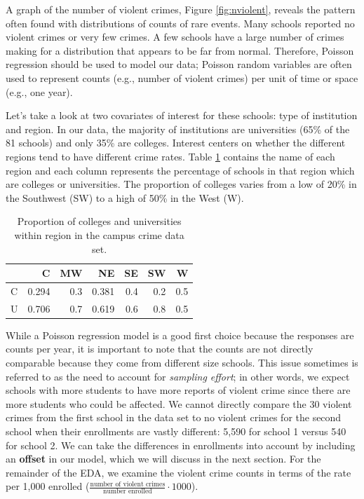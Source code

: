\documentclass[
]{krantz}
\begin{document}
A graph of the number of violent crimes, Figure \ref{fig:nviolent}, reveals the pattern often found with distributions of counts of rare events. Many schools reported no violent crimes or very few crimes. A few schools have a large number of crimes making for a distribution that appears to be far from normal. Therefore, Poisson regression should be used to model our data; Poisson random variables are often used to represent counts (e.g., number of violent crimes) per unit of time or space (e.g., one year).

Let's take a look at two covariates of interest for these schools: type of institution and region. In our data, the majority of institutions are universities (65\% of the 81 schools) and only 35\% are colleges. Interest centers on whether the different regions tend to have different crime rates. Table \ref{tab:regions} contains the name of each region and each column represents the percentage of schools in that region which are colleges or universities. The proportion of colleges varies from a low of 20\% in the Southwest (SW) to a high of 50\% in the West (W).

\begin{table}

\caption{\label{tab:regions}Proportion of colleges and universities within region in the campus crime data set.}
\centering
\begin{tabular}[t]{lrrrrrr}
\toprule
  & C & MW & NE & SE & SW & W\\
\midrule
C & 0.294 & 0.3 & 0.381 & 0.4 & 0.2 & 0.5\\
U & 0.706 & 0.7 & 0.619 & 0.6 & 0.8 & 0.5\\
\bottomrule
\end{tabular}
\end{table}

While a Poisson regression model is a good first choice because the responses are counts per year, it is important to note that the counts are not directly comparable because they come from different size schools. This issue sometimes is referred to as the need to account for \emph{sampling effort}; in other words, we expect schools with more students to have more reports of violent crime since there are more students who could be affected. We cannot directly compare the 30 violent crimes from the first school in the data set to no violent crimes for the second school when their enrollments are vastly different: 5,590 for school 1 versus 540 for school 2. We can take the differences in enrollments into account by including an \textbf{offset} in our model, which we will discuss in the next section. For the remainder of the EDA, we examine the violent crime counts in terms of the rate per 1,000 enrolled (\(\frac{\textrm{number of violent crimes}}{\textrm{number enrolled}} \cdot 1000\)).
\end{document}
